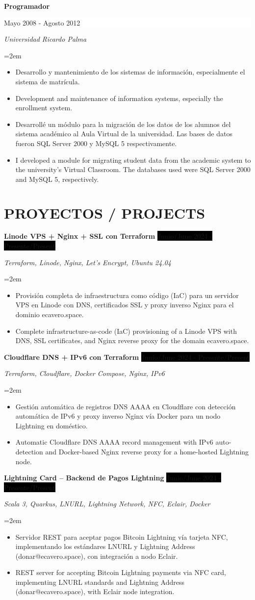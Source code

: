 \documentclass[paper=a4,fontsize=11pt]{scrartcl} %
\newcommand{\sepspace}{\vspace*{1em}}		%
\newcommand{\NewPart}[1]{\section*{\uppercase{#1}}}
\newcommand{\EducationEntry}[4]{
		\noindent \textbf{#1} \hfill      %
		\colorbox{White}{%
			\parbox{7cm}{%
			\hfill\color{Black}#2}} \par  %
		\noindent \textit{#3} \par        %
		\noindent\hangindent=2em\hangafter=0 \small #4 %
		\normalsize \par}
\newcommand{\ProjectEntry}[4]{				  %
		\noindent \textbf{#1} \hfill      %
		\noindent\colorbox{Black}{\color{White}#2} \par  %
		\noindent \textit{#3} \par              %
		\noindent\hangindent=2em\hangafter=0 \small #4 %
		\normalsize \par}
\begin{document}
\EducationEntry{Programador}{Mayo 2008 - Agosto 2012}{Universidad Ricardo Palma}{
\begin{itemize}
\item{Desarrollo y mantenimiento de los sistemas de información, especialmente el sistema de matrícula.}
\item{Development and maintenance of information systems, especially the enrollment system.}
\item{Desarrollé un módulo para la migración de los datos de los alumnos del sistema académico al Aula Virtual de la universidad. Las bases de datos fueron SQL Server 2000 y MySQL 5 respectivamente.}
\item{I developed a module for migrating student data from the academic system to the university's Virtual Classroom. The databases used were SQL Server 2000 and MySQL 5, respectively.}
\end{itemize}
}
\sepspace

\NewPart{Proyectos / Projects}{}

\ProjectEntry{Linode VPS + Nginx + SSL con Terraform}{Junio/June 2024 - Presente/Present}{Terraform, Linode, Nginx, Let's Encrypt, Ubuntu 24.04}{
\begin{itemize}
\item{Provisión completa de infraestructura como código (IaC) para un servidor VPS en Linode con DNS, certificados SSL y proxy inverso Nginx para el dominio ecavero.space.}
\item{Complete infrastructure-as-code (IaC) provisioning of a Linode VPS with DNS, SSL certificates, and Nginx reverse proxy for the domain ecavero.space.}
\end{itemize}
}
\sepspace

\ProjectEntry{Cloudflare DNS + IPv6 con Terraform}{Junio/June 2024 - Presente/Present}{Terraform, Cloudflare, Docker Compose, Nginx, IPv6}{
\begin{itemize}
\item{Gestión automática de registros DNS AAAA en Cloudflare con detección automática de IPv6 y proxy inverso Nginx vía Docker para un nodo Lightning en doméstico.}
\item{Automatic Cloudflare DNS AAAA record management with IPv6 auto-detection and Docker-based Nginx reverse proxy for a home-hosted Lightning node.}
\end{itemize}
}
\sepspace

\ProjectEntry{Lightning Card -- Backend de Pagos Lightning}{Junio/June 2024 - Presente/Present}{Scala 3, Quarkus, LNURL, Lightning Network, NFC, Eclair, Docker}{
\begin{itemize}
\item{Servidor REST para aceptar pagos Bitcoin Lightning vía tarjeta NFC, implementando los estándares LNURL y Lightning Address (donar@ecavero.space), con integración a nodo Eclair.}
\item{REST server for accepting Bitcoin Lightning payments via NFC card, implementing LNURL standards and Lightning Address (donar@ecavero.space), with Eclair node integration.}
\end{itemize}
}
\sepspace
\end{document}
